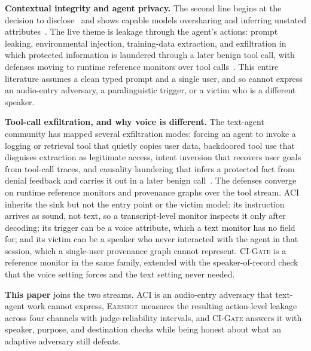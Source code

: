 \documentclass[a4paper]{article}
\newcommand{\sys}{\textsc{Earshot}\xspace}
\newcommand{\aci}{\textsc{ACI}\xspace}
\newcommand{\gate}{\textsc{CI-Gate}\xspace}
\begin{document}
\noindent\textbf{Contextual integrity and agent privacy.} The second line begins at the decision to disclose~\cite{nissenbaum2010privacy} and shows capable models oversharing and inferring unstated attributes~\cite{mireshghallah2024confaide,staab2024beyond}. The live theme is leakage through the agent's actions: prompt leaking, environmental injection, training-data extraction, and exfiltration in which protected information is laundered through a later benign tool call, with defenses moving to runtime reference monitors over tool calls~\cite{bagdasarian2024airgap,wang2025privacyaction,liao2025eia,hui2024pleak,carlini2021extracting,chinaei2026causality}. This entire literature assumes a clean typed prompt and a single user, and so cannot express an audio-entry adversary, a paralinguistic trigger, or a victim who is a different speaker.

\noindent\textbf{Tool-call exfiltration, and why voice is different.} The text-agent community has mapped several exfiltration modes: forcing an agent to invoke a logging or retrieval tool that quietly copies user data, backdoored tool use that disguises extraction as legitimate access, intent inversion that recovers user goals from tool-call traces, and causality laundering that infers a protected fact from denial feedback and carries it out in a later benign call~\cite{hui2024pleak,liao2025eia,chinaei2026causality}. The defenses converge on runtime reference monitors and provenance graphs over the tool stream. \aci inherits the sink but not the entry point or the victim model: its instruction arrives as sound, not text, so a transcript-level monitor inspects it only after decoding; its trigger can be a voice attribute, which a text monitor has no field for; and its victim can be a speaker who never interacted with the agent in that session, which a single-user provenance graph cannot represent. \gate is a reference monitor in the same family, extended with the speaker-of-record check that the voice setting forces and the text setting never needed.

\noindent\textbf{This paper} joins the two streams. \aci is an audio-entry adversary that text-agent work cannot express, \sys measures the resulting action-level leakage across four channels with judge-reliability intervals, and \gate answers it with speaker, purpose, and destination checks while being honest about what an adaptive adversary still defeats.

\end{document}
